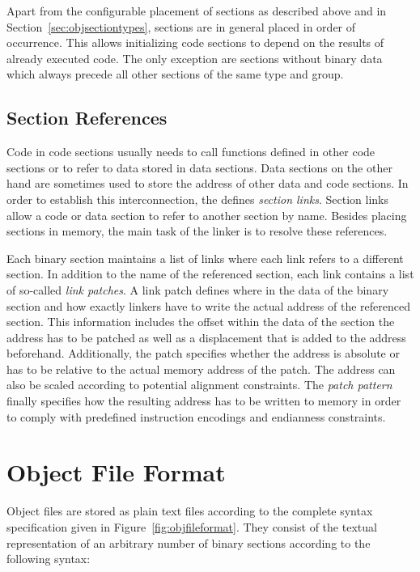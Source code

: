 Apart from the configurable placement of sections as described above and in Section~\ref{sec:objsectiontypes}, sections are in general placed in order of occurrence.
This allows initializing code sections to depend on the results of already executed code.
The only exception are sections without binary data which always precede all other sections of the same type and group.

\subsection{Section References}

Code in code sections usually needs to call functions defined in other code sections or to refer to data stored in data sections.
Data sections on the other hand are sometimes used to store the address of other data and code sections.
In order to establish this interconnection, the \ecs{} defines \emph{section links}.
Section links allow a code or data section to refer to another section by name.
Besides placing sections in memory, the main task of the linker is to resolve these references.

Each binary section maintains a list of links where each link refers to a different section.
In addition to the name of the referenced section, each link contains a list of so-called \emph{link patches}.
A link patch defines where in the data of the binary section and how exactly linkers have to write the actual address of the referenced section.
This information includes the offset within the data of the section the address has to be patched as well as a displacement that is added to the address beforehand.
Additionally, the patch specifies whether the address is absolute or has to be relative to the actual memory address of the patch.
The address can also be scaled according to potential alignment constraints.
The \emph{patch pattern} finally specifies how the resulting address has to be written to memory in order to comply with predefined instruction encodings and endianness constraints.

\section{Object File Format}

Object files are stored as plain text files according to the complete syntax specification given in Figure~\ref{fig:objfileformat}.
They consist of the textual representation of an arbitrary number of binary sections according to the following syntax:

